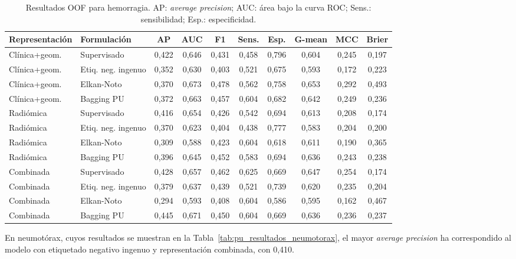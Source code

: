 \begin{table}[!htbp]
\centering
\caption{Resultados OOF para hemorragia. AP: \textit{average precision}; AUC: área bajo la curva ROC; Sens.: sensibilidad; Esp.: especificidad.}
\label{tab:pu_resultados_hemorragia}
\scriptsize
\begin{adjustbox}{max width=\textwidth}
\begin{tabular}{llcccccccc}
\toprule
\textbf{Representación} & \textbf{Formulación} & \textbf{AP} & \textbf{AUC} & \textbf{F1} & \textbf{Sens.} & \textbf{Esp.} & \textbf{G-mean} & \textbf{MCC} & \textbf{Brier} \\
\midrule
Clínica+geom. & Supervisado & 0,422 & 0,646 & 0,431 & 0,458 & 0,796 & 0,604 & 0,245 & 0,197 \\
Clínica+geom. & Etiq. neg. ingenuo & 0,352 & 0,630 & 0,403 & 0,521 & 0,675 & 0,593 & 0,172 & 0,223 \\
Clínica+geom. & Elkan-Noto & 0,370 & 0,673 & 0,478 & 0,562 & 0,758 & 0,653 & 0,292 & 0,493 \\
Clínica+geom. & Bagging PU & 0,372 & 0,663 & 0,457 & 0,604 & 0,682 & 0,642 & 0,249 & 0,236 \\
\midrule
Radiómica & Supervisado & 0,416 & 0,654 & 0,426 & 0,542 & 0,694 & 0,613 & 0,208 & 0,174 \\
Radiómica & Etiq. neg. ingenuo & 0,370 & 0,623 & 0,404 & 0,438 & 0,777 & 0,583 & 0,204 & 0,200 \\
Radiómica & Elkan-Noto & 0,309 & 0,588 & 0,423 & 0,604 & 0,618 & 0,611 & 0,190 & 0,365 \\
Radiómica & Bagging PU & 0,396 & 0,645 & 0,452 & 0,583 & 0,694 & 0,636 & 0,243 & 0,238 \\
\midrule
Combinada & Supervisado & 0,428 & 0,657 & 0,462 & 0,625 & 0,669 & 0,647 & 0,254 & 0,174 \\
Combinada & Etiq. neg. ingenuo & 0,379 & 0,637 & 0,439 & 0,521 & 0,739 & 0,620 & 0,235 & 0,204 \\
Combinada & Elkan-Noto & 0,294 & 0,593 & 0,408 & 0,604 & 0,586 & 0,595 & 0,162 & 0,467 \\
Combinada & Bagging PU & 0,445 & 0,671 & 0,450 & 0,604 & 0,669 & 0,636 & 0,236 & 0,237 \\
\bottomrule
\end{tabular}
\end{adjustbox}
\end{table}

En neumotórax, cuyos resultados se muestran en la Tabla~\ref{tab:pu_resultados_neumotorax}, el mayor \textit{average precision} ha correspondido al modelo con etiquetado negativo ingenuo y representación combinada, con 0,410.

